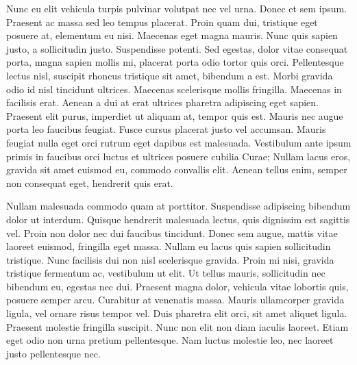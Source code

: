 Nunc eu elit vehicula turpis pulvinar volutpat nec vel urna.
Donec et sem ipsum.
Praesent ac massa sed leo tempus placerat.
Proin quam dui, tristique eget posuere at, elementum eu nisi.
Maecenas eget magna mauris.
Nunc quis sapien justo, a sollicitudin justo.
Suspendisse potenti.
Sed egestas, dolor vitae consequat porta, magna sapien mollis mi, placerat porta odio tortor quis orci.
Pellentesque lectus nisl, suscipit rhoncus tristique sit amet, bibendum a est.
Morbi gravida odio id nisl tincidunt ultrices.
Maecenas scelerisque mollis fringilla.
Maecenas in facilisis erat.
Aenean a dui at erat ultrices pharetra adipiscing eget sapien.
Praesent elit purus, imperdiet ut aliquam at, tempor quis est.
Mauris nec augue porta leo faucibus feugiat.
Fusce cursus placerat justo vel accumsan.
Mauris feugiat nulla eget orci rutrum eget dapibus est malesuada.
Vestibulum ante ipsum primis in faucibus orci luctus et ultrices posuere cubilia Curae; Nullam lacus eros, gravida sit amet euismod eu, commodo convallis elit.
Aenean tellus enim, semper non consequat eget, hendrerit quis erat.

Nullam malesuada commodo quam at porttitor.
Suspendisse adipiscing bibendum dolor ut interdum.
Quisque hendrerit malesuada lectus, quis dignissim est sagittis vel.
Proin non dolor nec dui faucibus tincidunt.
Donec sem augue, mattis vitae laoreet euismod, fringilla eget massa.
Nullam eu lacus quis sapien sollicitudin tristique.
Nunc facilisis dui non nisl scelerisque gravida.
Proin mi nisi, gravida tristique fermentum ac, vestibulum ut elit.
Ut tellus mauris, sollicitudin nec bibendum eu, egestas nec dui.
Praesent magna dolor, vehicula vitae lobortis quis, posuere semper arcu.
Curabitur at venenatis massa.
Mauris ullamcorper gravida ligula, vel ornare risus tempor vel.
Duis pharetra elit orci, sit amet aliquet ligula.
Praesent molestie fringilla suscipit.
Nunc non elit non diam iaculis laoreet.
Etiam eget odio non urna pretium pellentesque.
Nam luctus molestie leo, nec laoreet justo pellentesque nec.

